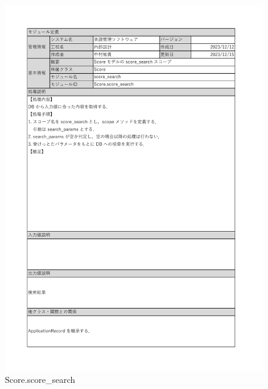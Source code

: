 \begin{figure}
    \centering
    \includegraphics[scale=0.5]{img/Method/Score_search(scope).pdf}
    \caption{Score.score\_search}
\end{figure}
\clearpage

